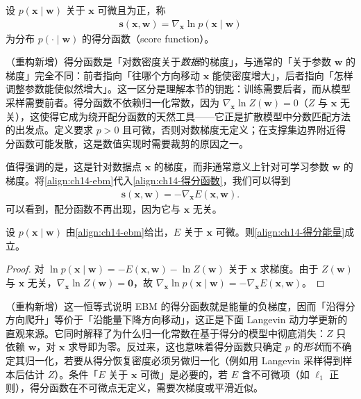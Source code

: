 \documentclass[../../main.tex]{subfiles}
\begin{document}
\begin{definition}[得分函数]\label{definition:ch14-得分函数}
设 $p(\bm{x}\mid\bm{w})$ 关于 $\bm{x}$ 可微且为正，称
\begin{align*}
\bm{s}(\bm{x},\bm{w})=\nabla_{\bm{x}}\ln p(\bm{x}\mid\bm{w})
\end{align*}
为分布 $p(\cdot\mid\bm{w})$ 的得分函数（score function）。
\end{definition}

\begin{remark}（重构新增）得分函数是「对数密度关于\emph{数据}的梯度」，与通常的「关于参数 $\bm{w}$ 的梯度」完全不同：前者指向「往哪个方向移动 $\bm{x}$ 能使密度增大」，后者指向「怎样调整参数能使似然增大」。这一区分是理解本节的钥匙：训练需要后者，而从模型采样需要前者。得分函数不依赖归一化常数，因为 $\nabla_{\bm{x}}\ln Z(\bm{w})=0$（$Z$ 与 $\bm{x}$ 无关），这使得它成为绕开配分函数的天然工具——它正是扩散模型中分数匹配方法的出发点。定义要求 $p>0$ 且可微，否则对数梯度无定义；在支撑集边界附近得分函数可能发散，这是数值实现时需要裁剪的原因之一。
\end{remark}

值得强调的是，这是针对数据点 $\bm{x}$ 的梯度，而非通常意义上针对可学习参数 $\bm{w}$ 的梯度。将\eqref{align:ch14-ebm}代入\eqref{align:ch14-得分函数}，我们可以得到
\begin{align}
\bm{s}(\bm{x},\bm{w})=-\nabla_{\bm{x}}E(\bm{x},\bm{w}).
\label{align:ch14-得分能量}
\end{align}
可以看到，配分函数不再出现，因为它与 $\bm{x}$ 无关。

\begin{proposition}[得分函数与能量函数]\label{proposition:ch14-得分与能量}
设 $p(\bm{x}\mid\bm{w})$ 由\eqref{align:ch14-ebm}给出，$E$ 关于 $\bm{x}$ 可微。则\eqref{align:ch14-得分能量}成立。
\end{proposition}

\begin{proof}
对 $\ln p(\bm{x}\mid\bm{w})=-E(\bm{x},\bm{w})-\ln Z(\bm{w})$ 关于 $\bm{x}$ 求梯度。由于 $Z(\bm{w})$ 与 $\bm{x}$ 无关，$\nabla_{\bm{x}}\ln Z(\bm{w})=\bm{0}$，故 $\nabla_{\bm{x}}\ln p(\bm{x}\mid\bm{w})=-\nabla_{\bm{x}}E(\bm{x},\bm{w})$。
\end{proof}

\begin{remark}（重构新增）这一恒等式说明 EBM 的得分函数就是能量的负梯度，因而「沿得分方向爬升」等价于「沿能量下降方向移动」，这正是下面 Langevin 动力学更新的直观来源。它同时解释了为什么归一化常数在基于得分的模型中彻底消失：$Z$ 只依赖 $\bm{w}$，对 $\bm{x}$ 求导即为零。反过来，这也意味着得分函数只确定 $p$ 的\emph{形状}而不确定其归一化，若要从得分恢复密度必须另做归一化（例如用 Langevin 采样得到样本后估计 $Z$）。条件「$E$ 关于 $\bm{x}$ 可微」是必要的，若 $E$ 含不可微项（如 $\ell_1$ 正则），得分函数在不可微点无定义，需要次梯度或平滑近似。
\end{remark}
\end{document}
